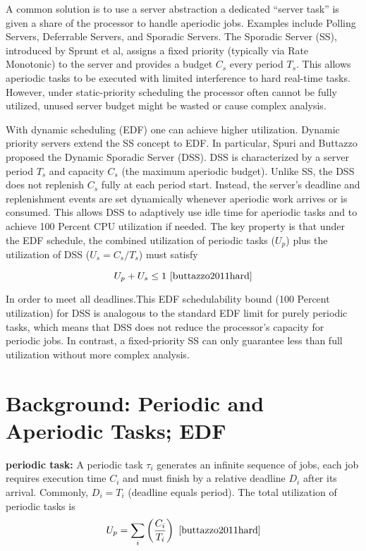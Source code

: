 \documentclass[conference]{IEEEtran}
\begin{document}
A common solution is to use a server abstraction a dedicated “server task” is given a share of the processor to handle aperiodic jobs. Examples include Polling Servers, Deferrable Servers, and Sporadic Servers. The Sporadic Server (SS), introduced by Sprunt et al\cite{sprunt1989aperiodic}, assigns a fixed priority (typically via Rate Monotonic) to the server and provides a budget $C_s$ every period $T_s$. This allows aperiodic tasks to be executed with limited interference to hard real-time tasks. However, under static-priority scheduling the processor often cannot be fully utilized, unused server budget might be wasted or cause complex analysis. 

With dynamic scheduling (EDF) one can achieve higher utilization. Dynamic priority servers extend the SS concept to EDF. In particular, Spuri and Buttazzo proposed the Dynamic Sporadic Server (DSS)\cite{spuri1994efficient}. DSS is characterized by a server period $T_s$ and capacity $C_s$ (the maximum aperiodic budget)\cite{buttazzo2011hard}. Unlike SS, the DSS does not replenish $C_s$ fully at each period start. Instead, the server’s deadline and replenishment events are set dynamically whenever aperiodic work arrives or is consumed\cite{spuri1994efficient}. This allows DSS to adaptively use idle time for aperiodic tasks and to achieve 100 Percent CPU utilization if needed. The key property is that under the EDF schedule, the combined utilization of periodic tasks ($U_p$)\cite{buttazzo2011hard} plus the utilization of DSS ($U_s = C_s/T_s$)\cite{buttazzo2011hard} must satisfy

\[
U_p + U_s \leq 1
   \ \cite{buttazzo2011hard}\]

In order to meet all deadlines\cite{spuri1994efficient}.This EDF schedulability bound (100 Percent utilization) for DSS is analogous to the standard EDF limit for purely periodic tasks, which means that DSS does not reduce the processor’s capacity for periodic jobs. In contrast, a fixed-priority SS can only guarantee less than full utilization without more complex analysis\cite{spuri1994efficient}.

\section{Background: Periodic and Aperiodic Tasks; EDF}

\textbf{periodic task:} A periodic task $\tau_i$ generates an infinite sequence of jobs, each job requires execution time $C_i$ and must finish by a relative deadline $D_i$ after its arrival. Commonly, $D_i = T_i$ (deadline equals period). The total utilization of periodic tasks is 
\[
U_p = \sum_i \left( \frac{C_i}{T_i} \right)
\ \cite{buttazzo2011hard} \]
\end{document}
